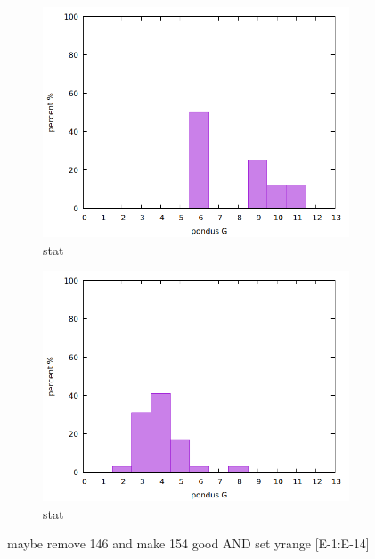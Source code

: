 \begin{figure}
\begin{subfigure}{.3\textwidth}
        \includegraphics[width=\textwidth]{Pics/iv/stat-154-okay-3x4F.png}
        \caption{stat} \label{fig:stat2}
    \end{subfigure}
    \begin{subfigure}{.3\textwidth}
        \includegraphics[width=\textwidth]{Pics/iv/stat-156-bad-3x3F.png}
        \caption{stat} \label{fig:stat3}
    \end{subfigure}
    \caption{maybe remove 146 and make 154 good AND set yrange [E-1:E-14]} \label{fig:iv}
\end{figure}

